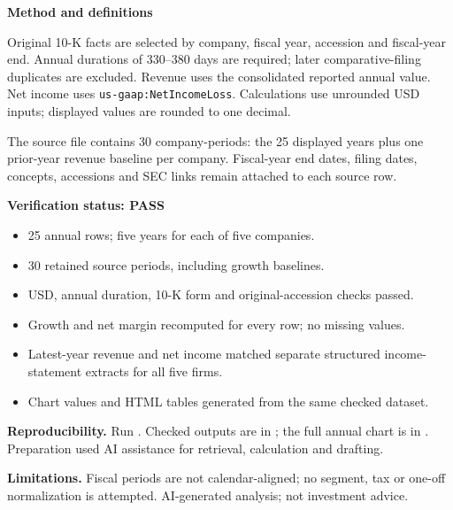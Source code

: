 \documentclass[a4paper,10pt]{article}
\begin{document}
\begin{minipage}[t]{0.49\textwidth}
\vspace{0pt}\small
\textbf{Method and definitions}\par
Original 10-K facts are selected by company, fiscal year, accession and fiscal-year end. Annual durations of 330--380 days are required; later comparative-filing duplicates are excluded. Revenue uses the consolidated reported annual value. Net income uses \texttt{us-gaap:NetIncomeLoss}. Calculations use unrounded USD inputs; displayed values are rounded to one decimal.

The source file contains 30 company-periods: the 25 displayed years plus one prior-year revenue baseline per company. Fiscal-year end dates, filing dates, concepts, accessions and SEC links remain attached to each source row.
\end{minipage}\hfill
\begin{minipage}[t]{0.48\textwidth}
\vspace{0pt}\small
\textbf{Verification status: PASS}\par
\begin{itemize}
\setlength{\itemsep}{1pt}
\setlength{\parskip}{0pt}
\item 25 annual rows; five years for each of five companies.
\item 30 retained source periods, including growth baselines.
\item USD, annual duration, 10-K form and original-accession checks passed.
\item Growth and net margin recomputed for every row; no missing values.
\item Latest-year revenue and net income matched separate structured income-statement extracts for all five firms.
\item Chart values and HTML tables generated from the same checked dataset.
\end{itemize}
\textbf{Reproducibility.} Run . Checked outputs are in ; the full annual chart is in . Preparation used AI assistance for retrieval, calculation and drafting.

\textbf{Limitations.} Fiscal periods are not calendar-aligned; no segment, tax or one-off normalization is attempted. AI-generated analysis; not investment advice.
\end{minipage}
\end{document}
